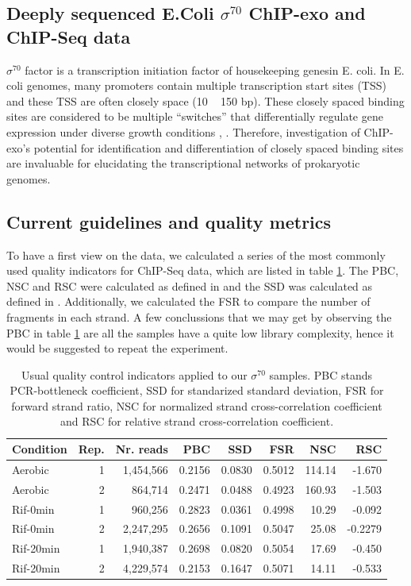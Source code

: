 \documentclass{bmcart}\usepackage[]{graphicx}\usepackage[]{color}
\begin{document}
\subsection{Deeply sequenced E.Coli $\sigma^{70}$ ChIP-exo and ChIP-Seq data}
\label{sec:ourdata}

$\sigma^{70}$ factor is a transcription initiation factor of
housekeeping genesin E. coli. In E. coli genomes, many promoters
contain multiple transcription start sites (TSS) and these TSS are
often closely space (10 ~ 150 bp). These closely spaced binding sites
are considered to be multiple ``switches'' that differentially
regulate gene expression under diverse growth conditions
\cite{regdb_old}, \cite{regulondb}. Therefore, investigation of
ChIP-exo's potential for identification and differentiation of closely
spaced binding sites are invaluable for elucidating the
transcriptional networks of prokaryotic genomes.

\subsection{Current guidelines and quality metrics}
\label{sec:qcnow}

To have a first view on the data, we calculated a series of the most
commonly used quality indicators for ChIP-Seq data, which are listed
in table \ref{tab:qcbase}. The PBC, NSC and RSC were calculated as
defined in \cite{encode_qc} and the SSD was calculated as defined in
\cite{htseq}. Additionally, we calculated the FSR to compare the
number of fragments in each strand. A few conclussions that we may get
by observing the PBC in table \ref{tab:qcbase} are all the samples
have a quite low library complexity, hence it would be suggested to
repeat the experiment. 

\begin{table}[h]
  \centering
\begin{tabular}{l|r|r|r|r|r|r|r}
\hline\hline
Condition & Rep. & Nr. reads & PBC & SSD & FSR & NSC & RSC \\
\hline\hline
Aerobic & 1 & 1,454,566 & 0.2156 & 0.0830 & 0.5012 & 114.14 & -1.670\\
\hline
Aerobic & 2 & 864,714 & 0.2471 & 0.0488 & 0.4923 & 160.93 & -1.503 \\
\hline
Rif-0min & 1 & 960,256 & 0.2823 & 0.0361 & 0.4998 & 10.29 & -0.092\\
\hline
Rif-0min & 2 & 2,247,295 & 0.2656 & 0.1091 & 0.5047 &  25.08 & -0.2279 \\
\hline
Rif-20min & 1 & 1,940,387 & 0.2698 & 0.0820 & 0.5054 & 17.69 & -0.450 \\
\hline
Rif-20min & 2 & 4,229,574 & 0.2153 & 0.1647 & 0.5071 &  14.11 & -0.533\\
\hline
\end{tabular}  
\caption{Usual quality control indicators applied to our $\sigma^{70}$ samples. PBC stands PCR-bottleneck coefficient, SSD for standarized standard deviation, FSR for forward strand ratio, NSC for normalized strand cross-correlation coefficient and RSC for relative strand cross-correlation coefficient.}
  \label{tab:qcbase}
\end{table}
\end{document}
